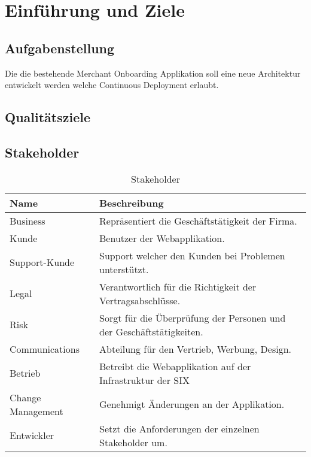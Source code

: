 \chapter{Einführung und Ziele}



\section{Aufgabenstellung}

Die die bestehende Merchant Onboarding Applikation soll eine neue Architektur entwickelt werden welche Continuous Deployment erlaubt.

\section{Qualitätsziele}

\section{Stakeholder}

\begin{table}[H]
	\centering
	\caption{Stakeholder}
	\begin{tabular}{ | p{2cm} | p{14cm} | }
		\toprule
		{\textbf{Name}} & {\textbf{Beschreibung}} \\
		\midrule
		Business & Repräsentiert die Geschäftstätigkeit der Firma.\\ \hline
		Kunde & Benutzer der Webapplikation. \\ \hline
		Support-Kunde & Support welcher den Kunden bei Problemen unterstützt. \\ \hline
		Legal &  Verantwortlich für die Richtigkeit der Vertragsabschlüsse. \\ \hline
		Risk & Sorgt für die Überprüfung der Personen und der Geschäftstätigkeiten. \\ \hline
		Communications & Abteilung für den Vertrieb, Werbung, Design. \\ \hline
		Betrieb & Betreibt die Webapplikation auf der Infrastruktur der SIX \\ \hline
		Change Management & Genehmigt Änderungen an der Applikation. \\ \hline
		Entwickler & Setzt die Anforderungen der einzelnen Stakeholder um. \\ 
		\bottomrule
	\end{tabular}
\end{table}